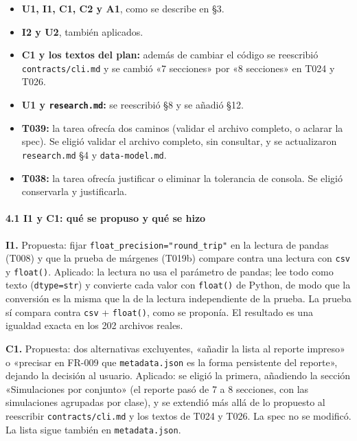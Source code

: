 \documentclass[12pt,a4paper]{article}
\providecommand{\tightlist}{\setlength{\itemsep}{0pt}\setlength{\parskip}{0pt}}
\newenvironment{documentogenerado}[2]{%
  \def\doccomando{#1}\def\docruta{#2}%
  \par\begingroup\small\setstretch{1.15}\sloppy%
}{\endgroup\par\medskip}
\begin{document}
\begin{documentogenerado}{/speckit-analyze + /speckit-converge}{specs\slash 001-preparacion-datos\slash auditoria.md}
\begin{itemize}
\tightlist
\item
  \textbf{U1, I1, C1, C2 y A1}, como se describe en §3.
\item
  \textbf{I2 y U2}, también aplicados.
\item
  \textbf{C1 y los textos del plan:} además de cambiar el código se reescribió \texttt{contracts/\allowbreak{}cli.\allowbreak{}md} y se cambió «7 secciones» por «8 secciones» en T024 y T026.
\item
  \textbf{U1 y \texttt{research.\allowbreak{}md}:} se reescribió §8 y se añadió §12.
\item
  \textbf{T039:} la tarea ofrecía dos caminos (validar el archivo completo, o aclarar la spec). Se eligió validar el archivo completo, sin consultar, y se actualizaron \texttt{research.\allowbreak{}md} §4 y \texttt{data-\allowbreak{}model.\allowbreak{}md}.
\item
  \textbf{T038:} la tarea ofrecía justificar o eliminar la tolerancia de consola. Se eligió conservarla y justificarla.
\end{itemize}

\paragraph{4.1 I1 y C1: qué se propuso y qué se hizo}

\textbf{I1.} Propuesta: fijar \texttt{float\_\allowbreak{}precision=\allowbreak{}"round\_\allowbreak{}trip"} en la lectura de pandas (T008) y que la prueba de márgenes (T019b) compare contra una lectura con \texttt{csv} y \texttt{float()}.
Aplicado: la lectura no usa el parámetro de pandas; lee todo como texto (\texttt{dtype=\allowbreak{}str}) y convierte cada valor con \texttt{float()} de Python, de modo que la conversión es la misma que la de la lectura independiente de la prueba. La prueba sí compara contra \texttt{csv} + \texttt{float()}, como se proponía. El resultado es una igualdad exacta en los 202 archivos reales.

\textbf{C1.} Propuesta: dos alternativas excluyentes, «añadir la lista al reporte impreso» o «precisar en FR-009 que \texttt{metadata.\allowbreak{}json} es la forma persistente del reporte», dejando la decisión al usuario.
Aplicado: se eligió la primera, añadiendo la sección «Simulaciones por conjunto» (el reporte pasó de 7 a 8 secciones, con las simulaciones agrupadas por clase), y se extendió más allá de lo propuesto al reescribir \texttt{contracts/\allowbreak{}cli.\allowbreak{}md} y los textos de T024 y T026. La spec no se modificó. La lista sigue también en \texttt{metadata.\allowbreak{}json}.


\end{documentogenerado}
\end{document}
